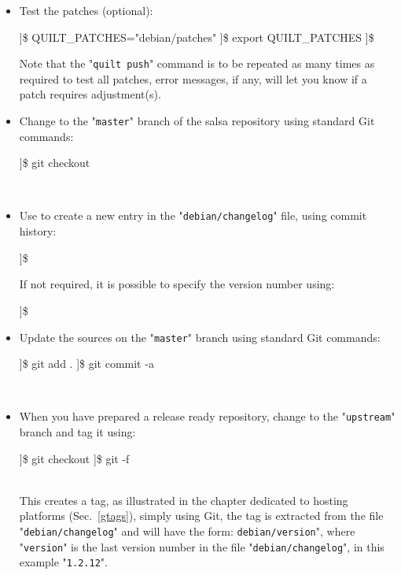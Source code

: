 \begin{itemize}
\item Test the patches (optional):
\vspace{-0.25cm}
\begin{scripti}
]\$ QUILT\_PATCHES="debian/patches"
]\$ export QUILT\_PATCHES
]\$  
\end{scripti}
\noindent Note that the "\texttt{quilt push}" command is to be repeated as many times as required to test all patches, 
error messages, if any, will let you know if a patch requires adjustment(s).
\item Change to the "\texttt{master}" branch of the salsa repository using standard Git commands: 
\vspace{-0.25cm}
\begin{scripti}
]\$ git checkout 
\end{scripti}
\\[-1.25cm]
\item Use  to create a new entry in the "\texttt{debian/changelog}" file, using commit history:
\vspace{-0.25cm}
\begin{scripti}
]\$   
\end{scripti}
\noindent If not required, it is possible to specify the version number using:
\vspace{-0.25cm}
\begin{scripti}
]\$   
\end{scripti}
\item Update the sources on the "\texttt{master}" branch using standard Git commands: 
\vspace{-0.25cm}
\begin{scripti}
]\$ git add .
]\$ git commit -a
\end{scripti}
\\[-1.25cm]
\item When you have prepared a release ready repository, change to the "\texttt{upstream}" branch and tag it using:
\vspace{-0.25cm}
\begin{scripti}
]\$ git checkout 
]\$ git  -f 
\end{scripti}
\\[-0.75cm]
\noindent This creates a tag, as illustrated in the chapter dedicated to hosting platforms (Sec.~\ref{gtags}), simply using Git, the tag is extracted from the file "\texttt{debian/changelog}" and will have the form: \texttt{debian/version}", where "\texttt{version}" is the last version number in the file "\texttt{debian/changelog}", in this example "\texttt{1.2.12}".

\end{itemize}
